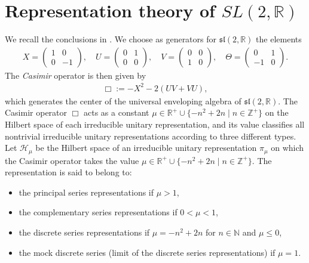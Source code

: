 \documentclass[11 pt]{amsart}
\newcommand{\NN}{\mathbb{N}}
\newcommand{\RR}{\mathbb{R}}
\theoremstyle{definition}
\numberwithin{equation}{section}
\begin{document}
\section{Representation theory of $SL(2,\RR)$}\label{sec:1} We recall the conclusions in \cite{Forni}. We choose as generators for $\mathfrak{sl}(2,\RR)$ the elements
\begin{align}\label{for:95}
X=\begin{pmatrix}
  1 & 0 \\
  0 & -1
\end{pmatrix},\quad U=\begin{pmatrix}
  0 & 1 \\
  0 & 0
\end{pmatrix},\quad V=\begin{pmatrix}
  0 & 0 \\
  1 & 0
\end{pmatrix},\quad \Theta=\begin{pmatrix}
  0 & 1 \\
  -1 & 0
\end{pmatrix}.
  \end{align}
The \emph{Casimir} operator is then given by
\begin{align*}
\Box:= -X^2-2(UV+VU),
\end{align*}
which generates the center of the universal enveloping algebra of $\mathfrak{sl}(2,\RR)$. The Casimir operator $\Box$
acts as a constant $\mu \in \mathbb{R}^+ \cup \{-n^2 + 2n \mid n \in \mathbb{Z}^+\}$ on the Hilbert space of each irreducible unitary representation, and its value classifies all nontrivial irreducible unitary representations according to three different types. Let $\mathcal{H}_\mu$ be the Hilbert space of an irreducible unitary representation $\pi_\mu$ on which the Casimir operator takes the value $\mu \in \mathbb{R}^+ \cup \{-n^2 + 2n \mid n \in \mathbb{Z}^+\}$. The representation is said to belong to:
\begin{itemize}
  \item the principal series representations if $\mu >1$,
\smallskip
  \item the complementary series representations if $0 < \mu < 1$,
  \smallskip
  \item the discrete series representations if $\mu=-n^2+2n$ for $n\in\NN$ and $\mu\leq0$,
  \smallskip
  \item the mock discrete series (limit of the discrete series representations) if $\mu=1$.
\end{itemize}
\end{document}
